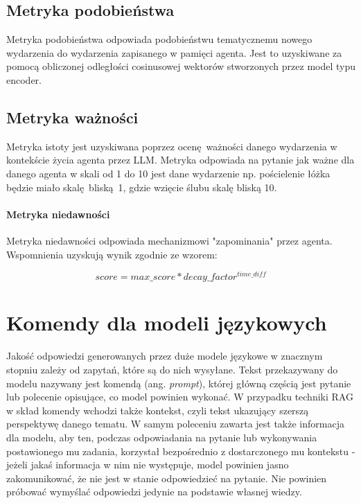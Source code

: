 \subsection*{Metryka podobieństwa}
Metryka podobieństwa odpowiada podobieństwu tematycznemu nowego wydarzenia do
wydarzenia zapisanego w pamięci agenta. Jest to uzyskiwane za pomocą obliczonej
odległości cosinusowej wektorów stworzonych przez model typu encoder.

\subsection*{Metryka ważności}
Metryka istoty jest uzyskiwana
poprzez ocenę ważności danego wydarzenia w kontekście życia agenta przez LLM.
Metryka odpowiada na pytanie jak ważne dla danego agenta w skali od 1 do 10 jest
dane wydarzenie np. pościelenie łóżka będzie miało skalę bliską 1, gdzie wzięcie
ślubu skalę bliską 10.

\paragraph{Metryka niedawności}
Metryka niedawności odpowiada mechanizmowi "zapominania" przez agenta.
Wspomnienia uzyskują wynik zgodnie ze wzorem:

\begin{equation}
	score = max\_score * decay\_factor ^ {time\_diff}
\end{equation}




\section{Komendy dla modeli językowych}

Jakość odpowiedzi generowanych przez duże modele językowe w znacznym stopniu zależy od zapytań, które są do nich wysyłane. Tekst przekazywany do modelu nazywany jest komendą (ang. \textit{prompt}), której główną częścią jest pytanie lub polecenie opisujące, co model powinien wykonać. W przypadku techniki RAG w skład komendy wchodzi także kontekst, czyli tekst ukazujący szerszą perspektywę danego tematu. W samym poleceniu zawarta jest także informacja dla modelu, aby ten, podczas odpowiadania na pytanie lub wykonywania postawionego mu zadania, korzystał bezpośrednio z dostarczonego mu kontekstu - jeżeli jakaś informacja w nim nie występuje, model powinien jasno zakomunikować, że nie jest w stanie odpowiedzieć na pytanie. Nie powinien próbować wymyślać odpowiedzi jedynie na podstawie własnej wiedzy.




